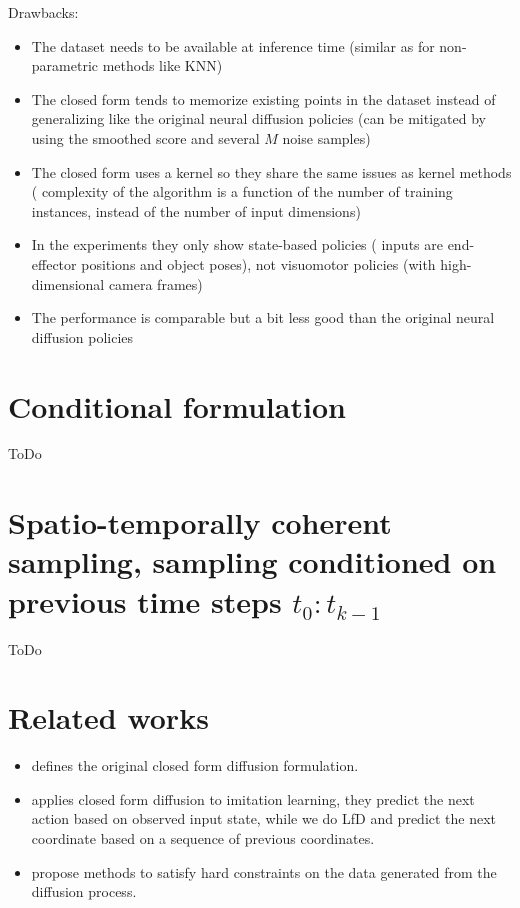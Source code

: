 \documentclass[11pt, a4paper]{article}
\begin{document}
Drawbacks:
\begin{itemize}
  \item The dataset needs to be available at inference time (similar as for non-parametric methods like KNN)
  \item The closed form tends to memorize existing points in the dataset instead of generalizing like the original neural diffusion policies (can be mitigated by using the smoothed score and several $M$ noise samples)
  \item The closed form uses a kernel so they share the same issues as kernel methods (\ie{} complexity of the algorithm is a function of the number of training instances, instead of the number of input dimensions)
  \item In the experiments they only show state-based policies (\ie{} inputs are end-effector positions and object poses), not visuomotor policies (with high-dimensional camera frames)
  \item The performance is comparable but a bit less good than the original neural diffusion policies
\end{itemize}


\section{Conditional formulation}
ToDo

\section{Spatio-temporally coherent sampling, \ie{} sampling conditioned on previous time steps $t_0:t_{k-1}$}
ToDo

\section{Related works}
\begin{itemize}
  \item \citep{scarvelis_closed-form_2025} defines the original closed form diffusion formulation.
  \item \citep{mishra_training-free_2026} applies closed form diffusion to imitation learning, \ie{} they predict the next action based on observed input state, while we do LfD and predict the next coordinate based on a sequence of previous coordinates.
  \item \citep{christopher_constrained_2024, zhang_constrained_2025} propose methods to satisfy hard constraints on the data generated from the diffusion process.
\end{itemize}


\end{document}
